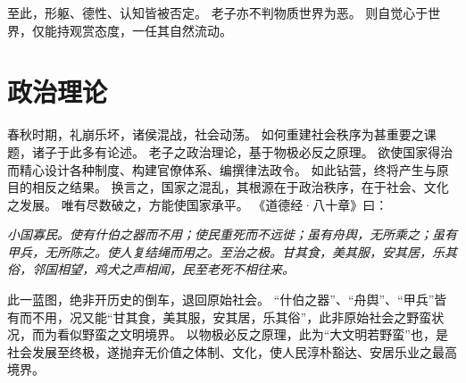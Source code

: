 \documentclass[11pt]{article}
\begin{document}
\newline

至此，形躯、德性、认知皆被否定。
老子亦不判物质世界为恶。
则自觉心于世界，仅能持观赏态度，一任其自然流动。
  
\section{政治理论}
春秋时期，礼崩乐坏，诸侯混战，社会动荡。
如何重建社会秩序为甚重要之课题，诸子于此多有论述。
老子之政治理论，基于物极必反之原理。
欲使国家得治而精心设计各种制度、构建官僚体系、编撰律法政令。
如此钻营，终将产生与原目的相反之结果。
换言之，国家之混乱，其根源在于政治秩序，在于社会、文化之发展。
唯有尽数破之，方能使国家承平。
《道德经·八十章》曰：

\textit{小国寡民。使有什伯之器而不用；使民重死而不远徙；虽有舟舆，无所乘之；虽有甲兵，无所陈之。使人复结绳而用之。至治之极。甘其食，美其服，安其居，乐其俗，邻国相望，鸡犬之声相闻，民至老死不相往来。}

此一蓝图，绝非开历史的倒车，退回原始社会。
“什伯之器”、“舟舆”、“甲兵”皆有而不用，况又能“甘其食，美其服，安其居，乐其俗”，此非原始社会之野蛮状况，而为看似野蛮之文明境界。
以物极必反之原理，此为“大文明若野蛮”也，是社会发展至终极，遂抛弃无价值之体制、文化，使人民淳朴豁达、安居乐业之最高境界。
\end{document}

